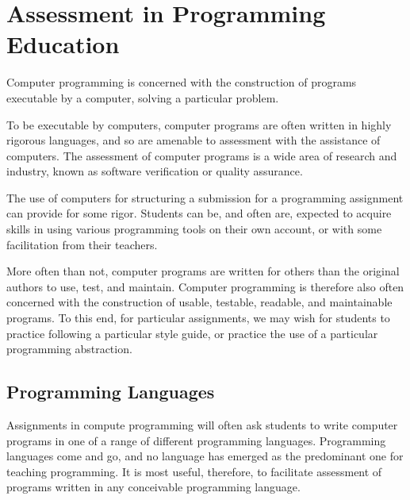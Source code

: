 
\section{Assessment in Programming Education}


Computer programming is concerned with the construction of programs executable
by a computer, solving a particular problem.

To be executable by computers, computer programs are often written in highly
rigorous languages, and so are amenable to assessment with the assistance of
computers. The assessment of computer programs is a wide area of research and
industry, known as software verification or quality assurance.

The use of computers for structuring a submission for a programming assignment
can provide for some rigor. Students can be, and often are, expected to acquire
skills in using various programming tools on their own account, or with some
facilitation from their teachers.

More often than not, computer programs are written for others than the original
authors to use, test, and maintain.  Computer programming is therefore also
often concerned with the construction of usable, testable, readable, and
maintainable programs. To this end, for particular assignments, we may wish for
students to practice following a particular style guide, or practice the use of
a particular programming abstraction.

\subsection{Programming Languages}

Assignments in compute programming will often ask students to write computer
programs in one of a range of different programming languages. Programming
languages come and go, and no language has emerged as the predominant one for
teaching programming. It is most useful, therefore, to facilitate assessment of
programs written in any conceivable programming language.

